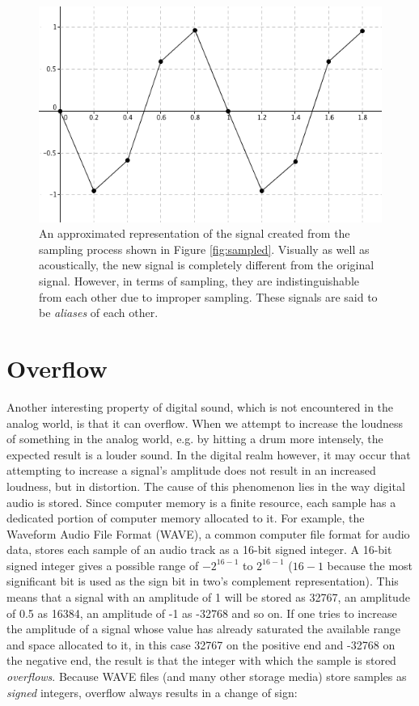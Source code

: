 \documentclass[12pt,twoside]{report}
\begin{document}
\begin{figure}

  \centering

  \includegraphics[scale=0.5]{img/approx}

  \caption{An approximated representation of the signal created from the sampling process shown in Figure \ref{fig:sampled}. Visually as well as acoustically, the new signal is completely different from the original signal. However, in terms of sampling, they are indistinguishable from each other due to improper sampling. These signals are said to be \emph{aliases} of each other.}

  \label{fig:approx}

\end{figure}

\section{Overflow}

Another interesting property of digital sound, which is not encountered in the analog world, is that it can overflow. When we attempt to increase the loudness of something in the analog world, e.g. by hitting a drum more intensely, the expected result is a louder sound. In the digital realm however, it may occur that attempting to increase a signal's amplitude does not result in an increased loudness, but in distortion. The cause of this phenomenon lies in the way digital audio is stored. Since computer memory is a finite resource, each sample has a dedicated portion of computer memory allocated to it. For example, the Waveform Audio File Format (WAVE), a common computer file format for audio data, stores each sample of an audio track as a 16-bit signed integer. A 16-bit signed integer gives a possible range of $-2^{16-1}$ to $2^{16-1}$ ($16-1$ because the most significant bit is used as the sign bit in two's complement representation). This means that a signal with an amplitude of 1 will be stored as 32767, an amplitude of 0.5 as 16384, an amplitude of -1 as -32768 and so on. If one tries to increase the amplitude of a signal whose value has already saturated the available range and space allocated to it, in this case 32767 on the positive end and -32768 on the negative end, the result is that the integer with which the sample is stored \emph{overflows}. Because WAVE files (and many other storage media) store samples as \emph{signed} integers, overflow always results in a change of sign:
\end{document}
